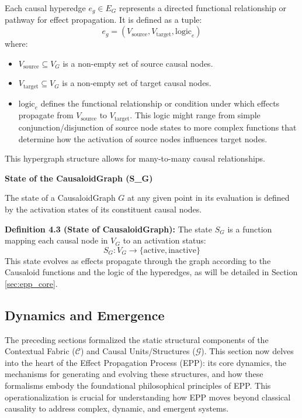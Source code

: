         
        Each causal hyperedge \( e_g \in E_G \) represents a directed functional relationship or pathway for effect propagation. It is defined as a tuple:
        \[ e_g = (V_{\text{source}}, V_{\text{target}}, \text{logic}_e) \]
        where:
        \begin{itemize}
            \item \( V_{\text{source}} \subseteq V_G \) is a non-empty set of source causal nodes.
            \item \( V_{\text{target}} \subseteq V_G \) is a non-empty set of target causal nodes.
            \item \( \text{logic}_e \) defines the functional relationship or condition under which effects propagate from \(V_{\text{source}}\) to \(V_{\text{target}}\). This logic might range from simple conjunction/disjunction of source node states to more complex functions that determine how the activation of source nodes influences target nodes.
        \end{itemize}
        This hypergraph structure allows for many-to-many causal relationships.

        
\textbf{State of the CausaloidGraph (S\_G)}
        
        The state of a CausaloidGraph \( G \) at any given point in its evaluation is defined by the activation states of its constituent causal nodes. 
        
        \textbf{Definition 4.3 (State of CausaloidGraph):} The state \( S_G \) is a function mapping each causal node in \(V_G\) to an activation status:
        \[ S_G: V_G \to \{\text{active}, \text{inactive}\} \]
        This state evolves as effects propagate through the graph according to the Causaloid functions and the logic of the hyperedges, as will be detailed in Section \ref{sec:epp_core}.



\subsection[Effect Propagation, Dynamics, and Emergence]{Dynamics and Emergence}
\label{sec:formalization_epp}

The preceding sections formalized the static structural components of the Contextual Fabric (\(\mathcal{C}\)) and Causal Units/Structures (\(\mathcal{G}\)). This section now delves into the heart of the Effect Propagation Process (EPP): its core dynamics, the mechanisms for generating and evolving these structures, and how these formalisms embody the foundational philosophical principles of EPP. This operationalization is crucial for understanding how EPP moves beyond classical causality to address complex, dynamic, and emergent systems.


